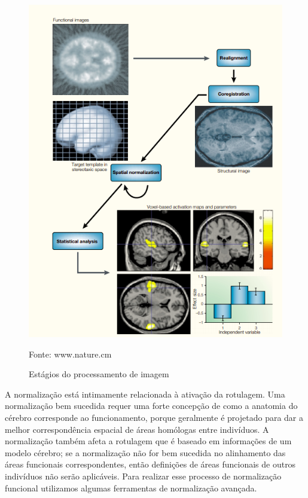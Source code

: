\documentclass[openright]{UFRGS} %
\begin{document}
\begin{figure}[h]
    \centering
    \caption{Estágios do processamento de imagem}
    \includegraphics[scale=0.40]{normalization_mri.png}
    \centerline{Fonte: www.nature.cm}
    \label{fig:normalizationmri}
\end{figure}

A normalização está intimamente relacionada à ativação da rotulagem. Uma normalização bem sucedida requer uma forte concepção de como a anatomia do cérebro corresponde ao funcionamento, porque geralmente é
projetado para dar a melhor correspondência espacial de áreas homólogas entre indivíduos. A normalização também afeta a rotulagem que
é baseado em informações de um modelo cérebro; se a normalização não for bem sucedida no alinhamento das áreas funcionais correspondentes, então definições de áreas funcionais de outros indivíduos não serão aplicáveis. Para realizar esse processo de normalização funcional utilizamos algumas ferramentas de normalização avançada. 
\end{document}
